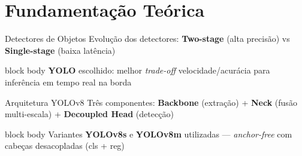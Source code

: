 
\section{Fundamentação Teórica}

\begin{frame}{Detectores de Objetos}
  \vspace{-2mm}
  {\small\color{sublabelcolor}%
    Evolução dos detectores: \textbf{Two-stage} (alta precisão) vs \textbf{Single-stage} (baixa latência)}

  \vfill
  \begin{center}
    \resizebox{!}{0.56\textheight}{}
  \end{center}
  \vfill

  \begin{beamercolorbox}[wd=\textwidth, rounded=true, shadow=false]{block body}
    \centering
    {\footnotesize\color{stagecolor}%
      \textbf{YOLO} escolhido: melhor \textit{trade-off} velocidade/acurácia para inferência em tempo real na borda}
  \end{beamercolorbox}
\end{frame}

\begin{frame}{Arquitetura YOLOv8}
  \vspace{-2mm}
  {\small\color{sublabelcolor}%
    Três componentes: \textbf{Backbone} (extração) + \textbf{Neck} (fusão multi-escala) + \textbf{Decoupled Head} (detecção)}

  \vfill
  \begin{center}
    \resizebox{0.92\textwidth}{!}{}
  \end{center}
  \vfill

  \begin{beamercolorbox}[wd=\textwidth, rounded=true, shadow=false]{block body}
    \centering
    {\footnotesize\color{stagecolor}%
      Variantes \textbf{YOLOv8s} e \textbf{YOLOv8m} utilizadas --- \textit{anchor-free} com cabeças desacopladas (cls + reg)}
  \end{beamercolorbox}
\end{frame}

